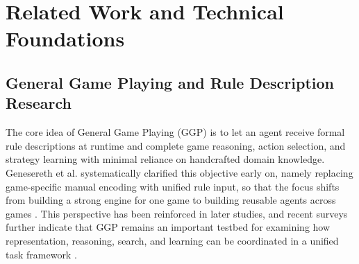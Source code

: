 ﻿%


\chapter{Related Work and Technical Foundations}
\setcounter{figure}{0}
\setcounter{equation}{0}
\renewcommand{\thefigure}{\thechapter-\arabic{figure}}
\renewcommand{\theequation}{\thechapter-\arabic{equation}}


\section{General Game Playing and Rule Description Research}


The core idea of General Game Playing (GGP) is to let an agent receive formal rule descriptions at runtime and complete game reasoning, action selection, and strategy learning with minimal reliance on handcrafted domain knowledge. Genesereth et al. systematically clarified this objective early on, namely replacing game-specific manual encoding with unified rule input, so that the focus shifts from building a strong engine for one game to building reusable agents across games \cite{genesereth2005general}. This perspective has been reinforced in later studies, and recent surveys further indicate that GGP remains an important testbed for examining how representation, reasoning, search, and learning can be coordinated in a unified task framework \cite{genesereth2026general}.


